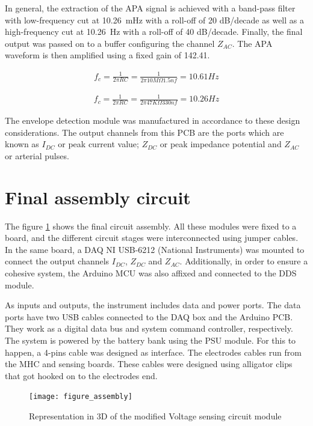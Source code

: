 In general, the extraction of the APA signal is achieved with a band-pass filter with low-frequency cut at \SI{10.26}{\milli\hertz} with a roll-off of \num{20} dB/decade as well as a high-frequency cut at \SI{10.26}{\Hz} with a roll-off of \num{40} dB/decade. Finally, the final output was passed on to a buffer configuring the channel $Z_{AC}$. The APA waveform is then amplified using a fixed gain of \num{142.41}.

\begin{align}
	\label{eg:fc2}
	f_c = \frac{1}{2 \pi R C} = \frac{1}{2 \pi 10M\Omega 1.5 nf}=10.61Hz
\end{align}

\begin{align}
	\label{eg:fc3}
	f_c = \frac{1}{2 \pi R C} = \frac{1}{2 \pi 47K\Omega 330nf}=10.26Hz
\end{align}

The envelope detection module was manufactured in accordance to these design considerations. The output channels from this PCB are the ports which are known as $I_{DC}$ or peak current value; $Z_{DC}$ or peak impedance potential and $Z_{AC}$ or arterial pulses.   

\section{Final assembly circuit}
\label{section design final}
The figure \ref{fig:assembly} shows the final circuit assembly. All these modules were fixed to a board, and the different circuit stages were interconnected using jumper cables. In the same board, a DAQ NI USB-6212 (National Instruments) was mounted to connect the output channels $I_{DC}$, $Z_{DC}$ and $Z_{AC}$. Additionally, in order to ensure a cohesive system, the Arduino MCU was also affixed and connected to the DDS module. 

As inputs and outputs, the instrument includes data and power ports. The data ports have two USB cables connected to the DAQ box and the Arduino PCB. They work as a digital data bus and system command controller, respectively. The system is powered by the battery bank using the PSU module. For this to happen, a 4-pins cable was designed as interface. The electrodes cables run from the MHC and sensing boards. These cables were designed using alligator clips that got hooked on to the electrodes end. 

\begin{figure}[!htpb]
	\centering
	\texttt{[image: figure\_assembly]}
	\caption{Representation in 3D of the modified Voltage sensing circuit module}
	\label{fig:assembly}
\end{figure}

